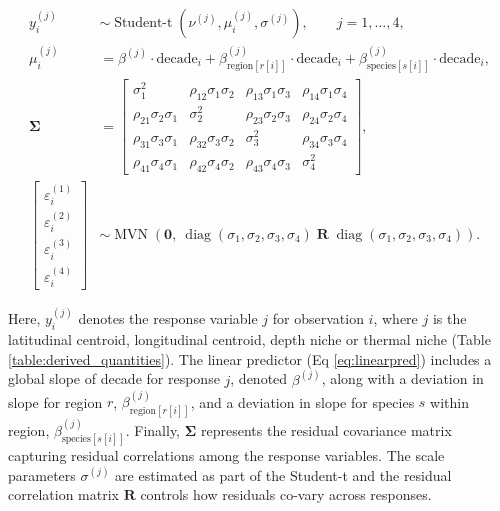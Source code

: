 \documentclass[11pt]{article}
\begin{document}
\begin{spacing}{1.5}
\begin{align}
y_{i}^{(j)} &\sim \operatorname{Student-t}\left(\nu^{(j)}, \mu_{i}^{(j)}, \sigma^{(j)}\right),\qquad j=1,\dots,4,\\
\mu_{i}^{(j)} &= \beta^{(j)} \cdot \text{decade}_{i} + \beta_{\text{region}[r[i]]}^{(j)} \cdot \text{decade}_{i} + \beta_{\text{species}[s[i]]}^{(j)} \cdot \text{decade}_{i},\label{eq:linearpred} \\
\boldsymbol{\Sigma} &=
\begin{bmatrix}
\sigma_1^2 & \rho_{12}\sigma_1\sigma_2 & \rho_{13}\sigma_1\sigma_3 & \rho_{14}\sigma_1\sigma_4 \\
\rho_{21}\sigma_2\sigma_1 & \sigma_2^2 & \rho_{23}\sigma_2\sigma_3 & \rho_{24}\sigma_2\sigma_4 \\
\rho_{31}\sigma_3\sigma_1 & \rho_{32}\sigma_3\sigma_2 & \sigma_3^2 & \rho_{34}\sigma_3\sigma_4 \\
\rho_{41}\sigma_4\sigma_1 & \rho_{42}\sigma_4\sigma_2 & \rho_{43}\sigma_4\sigma_3 & \sigma_4^2
\end{bmatrix},\\
\begin{bmatrix}
\varepsilon_i^{(1)} \\ \varepsilon_i^{(2)} \\ \varepsilon_i^{(3)} \\ \varepsilon_i^{(4)}
\end{bmatrix}
&\sim \operatorname{MVN}\!\left(
\mathbf{0},\ 
\operatorname{diag}(\sigma_1,\sigma_2,\sigma_3,\sigma_4)\;
\mathbf{R}\;
\operatorname{diag}(\sigma_1,\sigma_2,\sigma_3,\sigma_4)
\right).
\end{align}

\vspace{1em}

\noindent Here, $y^{(j)}_i$ denotes the response variable $j$ for observation $i$, where $j$ is the latitudinal centroid,
longitudinal centroid, depth niche or thermal niche (Table \ref{table:derived_quantities}). The linear predictor (Eq \ref{eq:linearpred}) includes a global slope of decade for response $j$, denoted $\beta^{(j)}$, along with a deviation in slope for region $r$, $\beta^{(j)}_{\text{region}[r[i]]}$, and a deviation in slope for species $s$ within region, $\beta^{(j)}_{\text{species}[s[i]]}$. Finally,
$\boldsymbol{\Sigma}$ represents the residual covariance matrix capturing residual correlations among the response variables. The scale parameters $\sigma^{(j)}$ are estimated as part of the Student-t and the residual correlation matrix $\mathbf{R}$ controls how residuals co-vary across responses.


\end{spacing}
\end{document}
